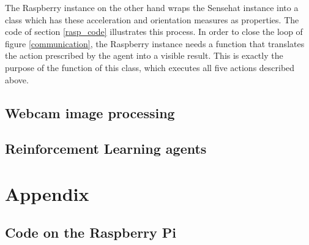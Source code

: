 The Raspberry instance on the other hand wraps the Sensehat instance into a class which has these acceleration and orientation measures as properties.  The code of section \ref{rasp_code} illustrates this process. In order to close the loop of figure \ref{communication}, the Raspberry instance needs a function that translates the action prescribed by the agent into a visible result. This is exactly the purpose of the  \texttt{} function of this class, which executes all five actions described above.

\section{Webcam image processing}

\section{Reinforcement Learning agents}

\chapter{Appendix}

\section{Code on the Raspberry Pi}

